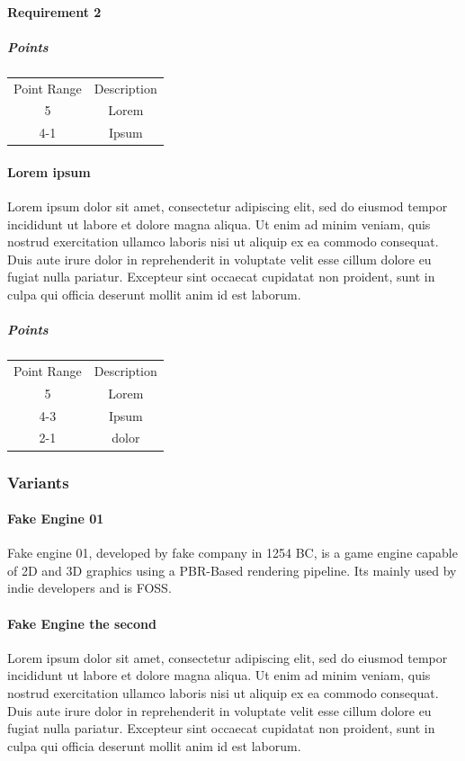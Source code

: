 \documentclass[10pt,a4paper]{article}
\begin{document}
\paragraph{Requirement 2}
\subparagraph{Points}
\begin{tabular}{c c}
Point Range & Description\\
5&Lorem\\
4-1&Ipsum
\end{tabular}

\paragraph{Lorem ipsum}
Lorem ipsum dolor sit amet, consectetur adipiscing elit, sed do eiusmod tempor incididunt ut labore et dolore magna aliqua. Ut enim ad minim veniam, quis nostrud exercitation ullamco laboris nisi ut aliquip ex ea commodo consequat. Duis aute irure dolor in reprehenderit in voluptate velit esse cillum dolore eu fugiat nulla pariatur. Excepteur sint occaecat cupidatat non proident, sunt in culpa qui officia deserunt mollit anim id est laborum.
\subparagraph{Points}
\begin{tabular}{c c}
Point Range & Description\\
5&Lorem\\
4-3&Ipsum\\
2-1&dolor
\end{tabular}

\subsubsection{Variants}

\paragraph{Fake Engine 01}
Fake engine 01, developed by fake company in 1254 BC, is a game engine capable of 2D and 3D graphics using a PBR-Based rendering pipeline. Its mainly used by indie developers and is FOSS.

\paragraph{Fake Engine the second}
Lorem ipsum dolor sit amet, consectetur adipiscing elit, sed do eiusmod tempor incididunt ut labore et dolore magna aliqua. Ut enim ad minim veniam, quis nostrud exercitation ullamco laboris nisi ut aliquip ex ea commodo consequat. Duis aute irure dolor in reprehenderit in voluptate velit esse cillum dolore eu fugiat nulla pariatur. Excepteur sint occaecat cupidatat non proident, sunt in culpa qui officia deserunt mollit anim id est laborum.
\end{document}
